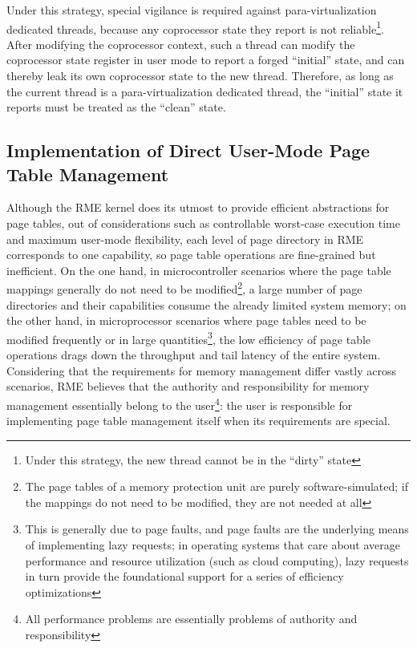 Under this strategy, special vigilance is required against para-virtualization dedicated threads, because any coprocessor state they report is not reliable\footnote{Under this strategy, the new thread cannot be in the ``dirty'' state}. After modifying the coprocessor context, such a thread can modify the coprocessor state register in user mode to report a forged ``initial'' state, and can thereby leak its own coprocessor state to the new thread. Therefore, as long as the current thread is a para-virtualization dedicated thread, the ``initial'' state it reports must be treated as the ``clean'' state.

\subsection{Implementation of Direct User-Mode Page Table Management}\label{subsec:9-user-mode-page-table-management}

Although the RME kernel does its utmost to provide efficient abstractions for page tables, out of considerations such as controllable worst-case execution time and maximum user-mode flexibility, each level of page directory in RME corresponds to one capability, so page table operations are fine-grained but inefficient. On the one hand, in microcontroller scenarios where the page table mappings generally do not need to be modified\footnote{The page tables of a memory protection unit are purely software-simulated; if the mappings do not need to be modified, they are not needed at all}, a large number of page directories and their capabilities consume the already limited system memory; on the other hand, in microprocessor scenarios where page tables need to be modified frequently or in large quantities\footnote{This is generally due to page faults, and page faults are the underlying means of implementing lazy requests; in operating systems that care about average performance and resource utilization (such as cloud computing), lazy requests in turn provide the foundational support for a series of efficiency optimizations}, the low efficiency of page table operations drags down the throughput and tail latency of the entire system. Considering that the requirements for memory management differ vastly across scenarios, RME believes that the authority and responsibility for memory management essentially belong to the user\footnote{All performance problems are essentially problems of authority and responsibility}: the user is responsible for implementing page table management itself when its requirements are special.

